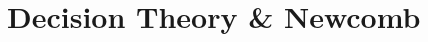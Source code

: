 ﻿%









\setcounter{section}{4} %




\section{Decision Theory \& Newcomb}

\begin{frame}

\scriptsize{\tableofcontents}

\end{frame}


